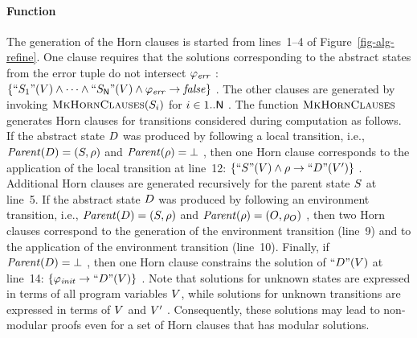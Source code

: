 \paragraph{Function \algMkHornClauses} 
The generation of the Horn clauses is started from lines~1--4 of
Figure~\ref{fig-alg-refine}.
One clause requires that the solutions corresponding to the abstract
states from the error tuple do not intersect $\SymbError\ $:
$\{\text{``}S_1\text{''}(V) \land \dots \land \text{``}S_{\mathsf{N}}\text{''}(V)
  \land \varphi_{\mathit{err}} \rightarrow \mathit{false}\}\ $.
The other clauses are generated by invoking $\textsc{MkHornClauses}(S_i)$
for $i\in1..\mathsf{N}\ $.
The function $\textsc{MkHornClauses}$ generates Horn clauses for
transitions considered during \aret computation as follows.
If the abstract state $D$ was produced by following a local
transition, i.e., $\mathit{Parent}(D)=(S,\rho)$ and
$\mathit{Parent}(\rho)=\bot\ $, then one Horn clause corresponds to the
application of the local transition at line~12:
$\{\text{``}S\text{''}(V)\land \rho \rightarrow
  \text{``}D\text{''}(V')\}\ $.
Additional Horn clauses are generated recursively for the parent
state $S$ at line~5.
If the abstract state $D$ was produced by following an
environment transition, i.e., $\mathit{Parent}(D)=(S,\rho)$
and $\artParent(\rel)=(\StateOrig, \OrigRel)\ $, then two Horn clauses 
correspond to the generation of the environment transition (line~9)
and to the application of the environment transition (line~10).
Finally, if $\mathit{Parent}(D)=\bot\ $, then one Horn clause 
constrains the solution of $\text{``}D\text{''}(V)$ at line~14:
$\{\varphi_{\mathit{init}} \rightarrow\text{``}D\text{''}(V)\}\ $.
Note that solutions for unknown states are expressed in terms of all
program variables $V$, while solutions for unknown transitions are
expressed in terms of $V$ and $V'\ $.
Consequently, these solutions may lead to non-modular proofs even for
a set of Horn clauses that has modular solutions.


